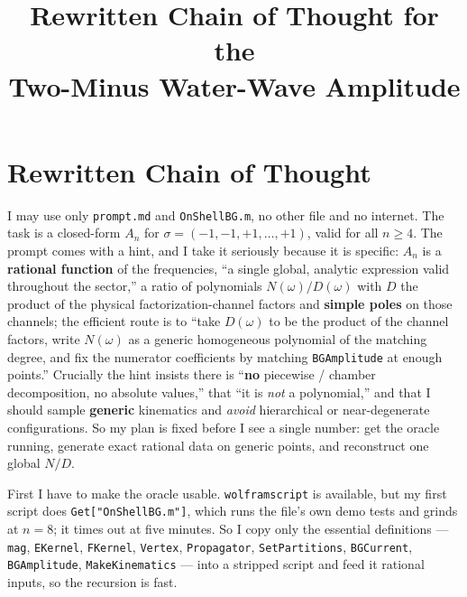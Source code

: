 \documentclass{article}
\title{Rewritten Chain of Thought for the\\
Two-Minus Water-Wave Amplitude}
\author{}
\date{}
\begin{document}
\maketitle


\section*{Rewritten Chain of Thought}

I may use only \texttt{prompt.md} and \texttt{OnShellBG.m}, no other file and no
internet. The task is a closed-form $A_n$ for $\sigma=(-1,-1,+1,\dots,+1)$, valid
for all $n\ge4$. The prompt comes with a hint, and I take it seriously because it
is specific: $A_n$ is a \textbf{rational function} of the frequencies, ``a single
global, analytic expression valid throughout the sector,'' a ratio of polynomials
$N(\omega)/D(\omega)$ with $D$ the product of the physical
factorization-channel factors and \textbf{simple poles} on those channels;
the efficient route is to ``take $D(\omega)$ to be the product of the channel
factors, write $N(\omega)$ as a generic homogeneous polynomial of the matching
degree, and fix the numerator coefficients by matching \texttt{BGAmplitude} at
enough points.'' Crucially the hint insists there is ``\textbf{no} piecewise /
chamber decomposition, no absolute values,'' that ``it is \emph{not} a
polynomial,'' and that I should sample \textbf{generic} kinematics and
\emph{avoid} hierarchical or near-degenerate configurations. So my plan is fixed
before I see a single number: get the oracle running, generate exact rational
data on generic points, and reconstruct one global $N/D$.

First I have to make the oracle usable. \texttt{wolframscript} is available, but
my first script does \texttt{Get["OnShellBG.m"]}, which runs the file's own demo
tests and grinds at $n=8$; it times out at five minutes. So I copy only the
essential definitions --- \texttt{mag}, \texttt{EKernel}, \texttt{FKernel},
\texttt{Vertex}, \texttt{Propagator}, \texttt{SetPartitions}, \texttt{BGCurrent},
\texttt{BGAmplitude}, \texttt{MakeKinematics} --- into a stripped script and feed
it rational inputs, so the recursion is fast.
\end{document}
